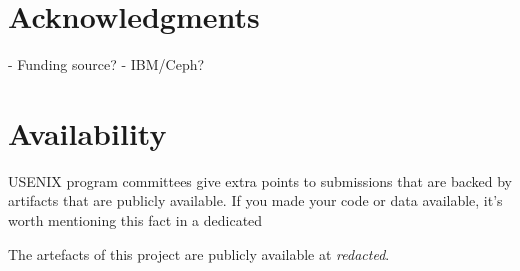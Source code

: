 \section*{Acknowledgments}

- Funding source?
- IBM/Ceph?

\section*{Availability}

USENIX program committees give extra points to submissions that are
backed by artifacts that are publicly available. If you made your code
or data available, it's worth mentioning this fact in a dedicated

The artefacts of this project are publicly available at \textit{redacted}.
